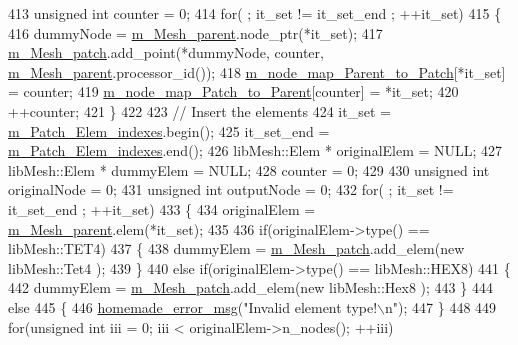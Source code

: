 \begin{DoxyCode}
413     \textcolor{keywordtype}{unsigned} \textcolor{keywordtype}{int} counter = 0;
414     \textcolor{keywordflow}{for}( ; it\_set != it\_set\_end ; ++it\_set)
415     \{
416         dummyNode = \hyperlink{classcarl_1_1_patch__construction_aec2f60b62d5d7b44bfcc4f9ca9de28d2}{m\_Mesh\_parent}.node\_ptr(*it\_set);
417         \hyperlink{classcarl_1_1_patch__construction_a4dfae5a2c4a983ac31dacec1cdb29d11}{m\_Mesh\_patch}.add\_point(*dummyNode, counter, \hyperlink{classcarl_1_1_patch__construction_aec2f60b62d5d7b44bfcc4f9ca9de28d2}{m\_Mesh\_parent}.processor\_id());
418         \hyperlink{classcarl_1_1_patch__construction_aace17a766982c2c00b603561f3df9814}{m\_node\_map\_Parent\_to\_Patch}[*it\_set] = counter;
419         \hyperlink{classcarl_1_1_patch__construction_a8a53700b4debd54f12cd42d62f991e5a}{m\_node\_map\_Patch\_to\_Parent}[counter] = *it\_set;
420         ++counter;
421     \}
422 
423     \textcolor{comment}{// Insert the elements}
424     it\_set     = \hyperlink{classcarl_1_1_patch__construction_af7db498027d46bff8464757e824404fb}{m\_Patch\_Elem\_indexes}.begin();
425     it\_set\_end = \hyperlink{classcarl_1_1_patch__construction_af7db498027d46bff8464757e824404fb}{m\_Patch\_Elem\_indexes}.end();
426     libMesh::Elem * originalElem = NULL;
427     libMesh::Elem * dummyElem = NULL;
428     counter = 0;
429 
430     \textcolor{keywordtype}{unsigned} \textcolor{keywordtype}{int} originalNode = 0;
431     \textcolor{keywordtype}{unsigned} \textcolor{keywordtype}{int} outputNode = 0;
432     \textcolor{keywordflow}{for}( ; it\_set != it\_set\_end ; ++it\_set)
433     \{
434         originalElem = \hyperlink{classcarl_1_1_patch__construction_aec2f60b62d5d7b44bfcc4f9ca9de28d2}{m\_Mesh\_parent}.elem(*it\_set);
435 
436         \textcolor{keywordflow}{if}(originalElem->type() == libMesh::TET4)
437         \{
438             dummyElem = \hyperlink{classcarl_1_1_patch__construction_a4dfae5a2c4a983ac31dacec1cdb29d11}{m\_Mesh\_patch}.add\_elem(\textcolor{keyword}{new} libMesh::Tet4 );
439         \}
440         \textcolor{keywordflow}{else} \textcolor{keywordflow}{if}(originalElem->type() == libMesh::HEX8)
441         \{
442             dummyElem = \hyperlink{classcarl_1_1_patch__construction_a4dfae5a2c4a983ac31dacec1cdb29d11}{m\_Mesh\_patch}.add\_elem(\textcolor{keyword}{new} libMesh::Hex8 );
443         \}
444         \textcolor{keywordflow}{else}
445         \{
446             \hyperlink{common__header_8h_a05d65d26b911668ac90085745dca71f6}{homemade\_error\_msg}(\textcolor{stringliteral}{"Invalid element type!\(\backslash\)n"});
447         \}
448 
449         \textcolor{keywordflow}{for}(\textcolor{keywordtype}{unsigned} \textcolor{keywordtype}{int} iii = 0; iii < originalElem->n\_nodes(); ++iii)

\end{DoxyCode}
